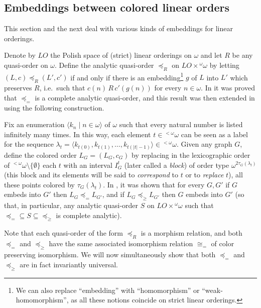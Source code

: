 \documentclass{amsart}
\theoremstyle{definition}
\theoremstyle{remark}
\begin{document}
\subsection{Embeddings between colored linear orders}\label{coloredlinearorders}

This section and the next deal with various kinds of embeddings for linear orderings.

Denote by $LO$ the Polish space of (strict) linear orderings on $\omega$ and
let $R$ be any quasi-order on $\omega$. Define the analytic quasi-order
$\preceq_R$ on $LO \times {}^\omega \omega$ by letting $(L,c)
\preceq_R (L',c')$ if and only if there is an
embedding\footnote{We can also replace ``embedding'' with
  ``homomorphism'' or ``weak-homomorphism'', as all these notions
  coincide on strict linear orderings.} $g$ of $L$
into $L'$ which preserves $R$, i.e.\ such that $c(n)\, R\, c'(g(n))$ for
every $n \in \omega$. In \cite{MarRos} it was proved that $\preceq_=$
is a complete analytic quasi-order, and this
result was then extended in \cite{Camerlo} using
the following construction.

Fix an enumeration $\langle k_n  \mid n \in \omega \rangle$ of $\omega$
such that every natural number is listed infinitely many times. In this
way, each element $t \in {{}^{<\omega}\omega}$ can be seen as a label for the sequence
$\lambda_t = \langle k_{t(0)}, k_{t(1)}, \dotsc, k_{t(|t|-1)} \rangle
\in {{}^{<\omega}\omega}$. Given any graph $G$, define the colored order $L_G = (L_G,
c_G)$ by replacing in the lexicographic order of ${{}^{<\omega}\omega} \setminus \{
\emptyset \}$ each $t$ with an interval $I^t_G$ (later called a
\emph{block}) of order type $\omega^{2 \tau_G(\lambda_t)}$ (this block
and its elements will be said to \emph{correspond} to $t$ or to
\emph{replace} $t$), all these points colored by $\tau_G(\lambda_t)$.
In \cite{Camerlo}, it was shown that for every $G,G'$ if $G$ embeds
into $G'$ then $L_G \preceq_= L_{G'}$, and if $L_G \preceq_\ge L_{G'}$
then $G$ embeds into $G'$ (so that, in particular, any analytic
quasi-order $S$ on $LO \times {}^\omega \omega$ such that ${\preceq_=}
\subseteq S \subseteq {\preceq_{\geq}}$ is complete analytic).

Note that each quasi-order of the form $\preceq_R$ is a morphism
relation, and both $\preceq_=$ and $\preceq_\ge$ have the same
associated isomorphism relation $\cong_=$ of color
preserving isomorphism. We will now simultaneously show that both
$\preceq_=$ and
$\preceq_{\geq}$ are in fact invariantly universal.
\end{document}
